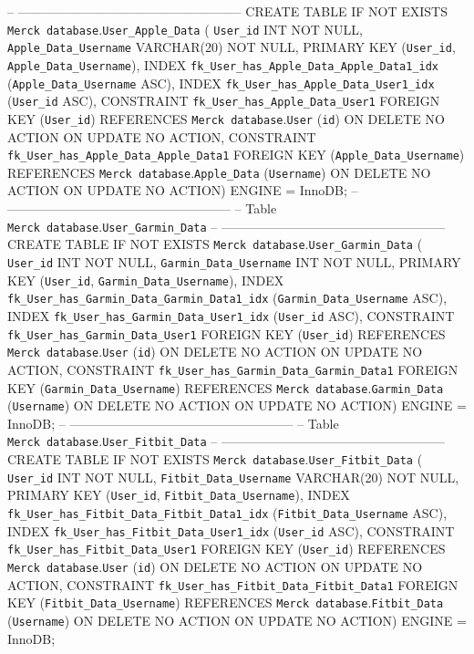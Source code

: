 \documentclass[]{book}
\begin{document}
-- -----------------------------------------------------
CREATE TABLE IF NOT EXISTS \texttt{Merck\ database}.\texttt{User\_Apple\_Data} (
\texttt{User\_id} INT NOT NULL,
\texttt{Apple\_Data\_Username} VARCHAR(20) NOT NULL,
PRIMARY KEY (\texttt{User\_id}, \texttt{Apple\_Data\_Username}),
INDEX \texttt{fk\_User\_has\_Apple\_Data\_Apple\_Data1\_idx} (\texttt{Apple\_Data\_Username} ASC),
INDEX \texttt{fk\_User\_has\_Apple\_Data\_User1\_idx} (\texttt{User\_id} ASC),
CONSTRAINT \texttt{fk\_User\_has\_Apple\_Data\_User1}
FOREIGN KEY (\texttt{User\_id})
REFERENCES \texttt{Merck\ database}.\texttt{User} (\texttt{id})
ON DELETE NO ACTION
ON UPDATE NO ACTION,
CONSTRAINT \texttt{fk\_User\_has\_Apple\_Data\_Apple\_Data1}
FOREIGN KEY (\texttt{Apple\_Data\_Username})
REFERENCES \texttt{Merck\ database}.\texttt{Apple\_Data} (\texttt{Username})
ON DELETE NO ACTION
ON UPDATE NO ACTION)
ENGINE = InnoDB;
-- -----------------------------------------------------
-- Table \texttt{Merck\ database}.\texttt{User\_Garmin\_Data}
-- -----------------------------------------------------
CREATE TABLE IF NOT EXISTS \texttt{Merck\ database}.\texttt{User\_Garmin\_Data} (
\texttt{User\_id} INT NOT NULL,
\texttt{Garmin\_Data\_Username} INT NOT NULL,
PRIMARY KEY (\texttt{User\_id}, \texttt{Garmin\_Data\_Username}),
INDEX \texttt{fk\_User\_has\_Garmin\_Data\_Garmin\_Data1\_idx} (\texttt{Garmin\_Data\_Username} ASC),
INDEX \texttt{fk\_User\_has\_Garmin\_Data\_User1\_idx} (\texttt{User\_id} ASC),
CONSTRAINT \texttt{fk\_User\_has\_Garmin\_Data\_User1}
FOREIGN KEY (\texttt{User\_id})
REFERENCES \texttt{Merck\ database}.\texttt{User} (\texttt{id})
ON DELETE NO ACTION
ON UPDATE NO ACTION,
CONSTRAINT \texttt{fk\_User\_has\_Garmin\_Data\_Garmin\_Data1}
FOREIGN KEY (\texttt{Garmin\_Data\_Username})
REFERENCES \texttt{Merck\ database}.\texttt{Garmin\_Data} (\texttt{Username})
ON DELETE NO ACTION
ON UPDATE NO ACTION)
ENGINE = InnoDB;
-- -----------------------------------------------------
-- Table \texttt{Merck\ database}.\texttt{User\_Fitbit\_Data}
-- -----------------------------------------------------
CREATE TABLE IF NOT EXISTS \texttt{Merck\ database}.\texttt{User\_Fitbit\_Data} (
\texttt{User\_id} INT NOT NULL,
\texttt{Fitbit\_Data\_Username} VARCHAR(20) NOT NULL,
PRIMARY KEY (\texttt{User\_id}, \texttt{Fitbit\_Data\_Username}),
INDEX \texttt{fk\_User\_has\_Fitbit\_Data\_Fitbit\_Data1\_idx} (\texttt{Fitbit\_Data\_Username} ASC),
INDEX \texttt{fk\_User\_has\_Fitbit\_Data\_User1\_idx} (\texttt{User\_id} ASC),
CONSTRAINT \texttt{fk\_User\_has\_Fitbit\_Data\_User1}
FOREIGN KEY (\texttt{User\_id})
REFERENCES \texttt{Merck\ database}.\texttt{User} (\texttt{id})
ON DELETE NO ACTION
ON UPDATE NO ACTION,
CONSTRAINT \texttt{fk\_User\_has\_Fitbit\_Data\_Fitbit\_Data1}
FOREIGN KEY (\texttt{Fitbit\_Data\_Username})
REFERENCES \texttt{Merck\ database}.\texttt{Fitbit\_Data} (\texttt{Username})
ON DELETE NO ACTION
ON UPDATE NO ACTION)
ENGINE = InnoDB;
\end{document}

